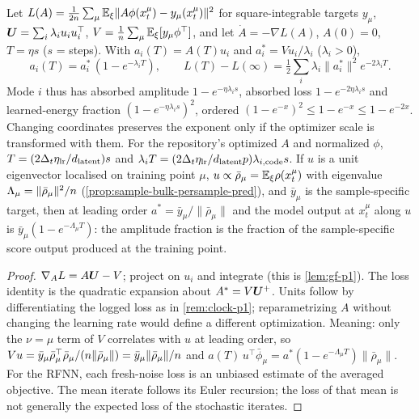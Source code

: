 \begin{proposition}\label{prop:mode-clocks-pred}
Let $L(A)=\frac1{2n}\sum_\mu\mathbb{E}_\xi\|A\phi(x_t^\mu)-y_\mu(x_t^\mu)\|^2$ for square-integrable targets $y_\mu$, $\bm{U}=\sum_i\lambda_iu_iu_i^\top$, $V=\frac1{n}\sum_\mu\mathbb{E}_\xi[y_\mu\phi^\top]$, and let $\dot A=-\nabla L(A)$, $A(0)=0$, $T=\eta s$ ($s$ = steps). With $a_i(T)=A(T)u_i$ and $a_i^*=Vu_i/\lambda_i$ ($\lambda_i>0$),
\[ a_i(T)=a_i^*\,(1-e^{-\lambda_iT}),\qquad L(T)-L(\infty)=\tfrac12\sum_i\lambda_i\|a_i^*\|^2e^{-2\lambda_iT}. \]
Mode $i$ thus has absorbed amplitude $1-e^{-\eta\lambda_is}$, absorbed loss $1-e^{-2\eta\lambda_is}$ and learned-energy fraction $(1-e^{-\eta\lambda_is})^2$, ordered $(1-e^{-x})^2\le1-e^{-x}\le1-e^{-2x}$. Changing coordinates preserves the exponent only if the optimizer scale is transformed with them. For the repository's optimized $A$ and normalized $\phi$, $T=(2\Delta_t\eta_{\rm lr}/d_{\mathrm{latent}})s$ and $\lambda_iT=(2\Delta_t\eta_{\rm lr}/d_{\mathrm{latent}}p)\lambda_{i,\rm code}s$. If $u$ is a unit eigenvector localised on training point $\mu$, $u\propto\bar\rho_\mu=\mathbb{E}_\xi\rho(x_t^\mu)$ with eigenvalue $\Lambda_\mu=\|\bar\rho_\mu\|^2/n$ (\cref{prop:sample-bulk-persample-pred}), and $\bar y_\mu$ is the sample-specific target, then at leading order $a^*=\bar y_\mu/\|\bar\rho_\mu\|$ and the model output at $x_t^\mu$ along $u$ is $\bar y_\mu(1-e^{-\Lambda_\mu T})$: the amplitude fraction is the fraction of the sample-specific score output produced at the training point.
\end{proposition}
\begin{proof}
$\nabla_AL=A\bm{U}-V$; project on $u_i$ and integrate (this is \cref{lem:gf-p1}). The loss identity is the quadratic expansion about $A^*=V\bm{U}^+$. Units follow by differentiating the logged loss as in \cref{rem:clock-p1}; reparametrizing $A$ without changing the learning rate would define a different optimization. Meaning: only the $\nu=\mu$ term of $V$ correlates with $u$ at leading order, so $Vu=\bar y_\mu\bar\rho_\mu^\top\bar\rho_\mu/(n\|\bar\rho_\mu\|)=\bar y_\mu\|\bar\rho_\mu\|/n$ and $a(T)\,u^\top\bar\phi_\mu=a^*(1-e^{-\Lambda_\mu T})\|\bar\rho_\mu\|$. For the RFNN, each fresh-noise loss is an unbiased estimate of the averaged objective. The mean iterate follows its Euler recursion; the loss of that mean is not generally the expected loss of the stochastic iterates.
\end{proof}

